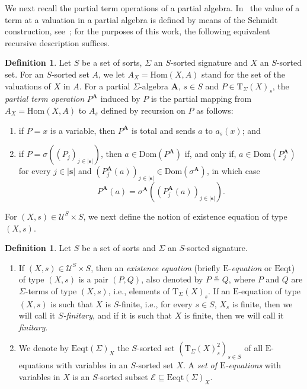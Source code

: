 \documentclass[a4paper, reqno
]{amsart}
\newcommand{\bb}[1]{\ensuremath{\lvert #1 \rvert}}
\newcommand{\eeq}{\overset{\mathrm e}{=}}      %
\newcommand{\Dom}{\mathrm{Dom}}
\theoremstyle{plain}
\theoremstyle{definition}
\newtheorem{definition}[theorem]{Definition}
\begin{document}
We next recall the partial term operations of a partial algebra.
In~\cite{CVCLRM26} the value of a term at a valuation in a partial algebra is defined by means of the Schmidt construction, see~\cite{sch70}; for the purposes of this work, the following equivalent recursive description suffices.

\begin{definition}\label{DTermOp}
Let $S$ be a set of sorts, $\Sigma$ an $S$-sorted signature and $X$ an $S$-sorted set.
For an $S$-sorted set $A$, we let $A_{X}=\mathrm{Hom}(X,A)$ stand for the set of the valuations of $X$ in $A$.
For a partial $\Sigma$-algebra $\mathbf{A}$, $s\in S$ and $P\in\mathrm{T}_{\Sigma}(X)_{s}$, the \emph{partial term operation} $P^{\mathbf{A}}$ induced by $P$ is the partial mapping from $A_{X}=\mathrm{Hom}(X,A)$ to $A_{s}$ defined by recursion on $P$ as follows:
\begin{enumerate}
\item if $P=x$ is a variable, then $P^{\mathbf{A}}$ is total and sends $a$ to $a_{s}(x)$; and
\item if $P=\sigma((P_{j})_{j\in\bb{\mathbf{s}}})$, then $a\in\Dom(P^{\mathbf{A}})$ if, and only if, $a\in\Dom(P_{j}^{\mathbf{A}})$ for every $j\in\bb{\mathbf{s}}$ and $(P_{j}^{\mathbf{A}}(a))_{j\in\bb{\mathbf{s}}}\in\Dom(\sigma^{\mathbf{A}})$, in which case
$$
P^{\mathbf{A}}(a)=\sigma^{\mathbf{A}}\left((P_{j}^{\mathbf{A}}(a))_{j\in\bb{\mathbf{s}}}\right).
$$
\end{enumerate}
\end{definition}

For $(X,s)\in\boldsymbol{\mathcal{U}}^{S}\times S$, we next define the notion of existence equation of type $(X,s)$.

\begin{definition}\label{DEEq}
Let $S$ be a set of sorts and $\Sigma$ an $S$-sorted signature.
\begin{enumerate}
\item If $(X,s)\in\boldsymbol{\mathcal{U}}^{S}\times S$, then an \emph{existence equation} (briefly $\mathrm{E}$-\emph{equation} or $\mathrm{Eeqt}$) of type $(X,s)$ is a pair $(P,Q)$, also denoted by $P\eeq Q$, where $P$ and $Q$ are $\Sigma$-terms of type $(X,s)$, i.e., elements of $\mathrm{T}_{\Sigma}(X)_{s}$.
If an $\mathrm{E}$-equation of type $(X,s)$ is such that $X$ is $S$-finite, i.e., for every $s\in S$, $X_{s}$ is finite, then we will call it $S$\emph{-finitary}, and if it is such that $X$ is finite, then we will call it \emph{finitary}.
\item We denote by $\mathrm{Eeqt}(\Sigma)_{X}$ the $S$-sorted set $(\mathrm{T}_{\Sigma}(X)_{s}^{2})_{s\in S}$ of all $\mathrm{E}$-equations with variables in an $S$-sorted set $X$.
A \emph{set of $\mathrm{E}$-equations} with variables in $X$ is an $S$-sorted subset $\mathcal{E}\subseteq\mathrm{Eeqt}(\Sigma)_{X}$.
\end{enumerate}
\end{definition}
\end{document}
